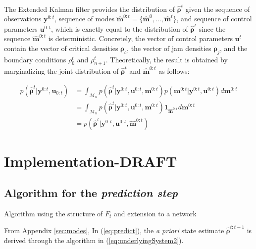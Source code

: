 The Extended Kalman filter provides the distribution of $\hat{\boldsymbol\rho}^{t}$ given the sequence of observations $\boldsymbol y^{0:t}$, sequence of modes $\hat{\boldsymbol m}^{0:t} = \{\hat{\boldsymbol m}^{0},...,\hat{\boldsymbol m}^{t}\}$, and sequence of control parameters $\boldsymbol u^{0:t}$, which is exactly equal to the distribution of $\hat{\boldsymbol\rho}^{t}$ since the sequence $\hat{\boldsymbol m}^{0:t}$ is deterministic. Concretely, the vector of control parameters $\boldsymbol u^{t}$ contain the vector of critical densities $\boldsymbol\rho_{c}$, the vector of jam densities $\boldsymbol\rho_{j}$, and the boundary conditions $\rho^{t}_{0}$ and $\rho^{t}_{n+1}$. Theoretically, the result is obtained by marginalizing the joint distribution of $\hat{\boldsymbol\rho}^{t}$ and $\hat{\boldsymbol m}^{0:t}$ as follows:

\begin{equation}
\begin{array}{ll}
p(\hat{\boldsymbol\rho}^{t}|\boldsymbol y^{0:t},\boldsymbol u_{0:t}) & =
\int_{\mathcal{M}_{n}} p(\hat{\boldsymbol\rho}^{t}|\boldsymbol y^{0:t},\boldsymbol u^{0:t},\boldsymbol m^{0:t})p(\boldsymbol m^{0:t}|\boldsymbol y^{0:t},\boldsymbol u^{0:t})
d\boldsymbol m^{0:t}\\ 
& = \int_{\mathcal{M}_{n}} p(\hat{\boldsymbol\rho}^{t}|\boldsymbol y^{0:t},\boldsymbol u^{0:t},\boldsymbol m^{0:t})\boldsymbol 1_{\hat{\boldsymbol m}^{0:t}}d\boldsymbol m^{0:t}\\[1ex]
& = p(\hat{\boldsymbol\rho}^{t}|\boldsymbol y^{0:t},\boldsymbol u^{0:t},\hat{\boldsymbol m}^{0:t})
\label{eq:marginalization}
\end{array}
\end{equation}

\section{Implementation-DRAFT}

\subsection{Algorithm for the \textit{prediction step}}

Algorithm using the structure of $F_{t}$ and extension to a network

From Appendix \ref{sec:modes},  In (\ref{eq:predict}), the \textit{a priori} state estimate $\hat{\boldsymbol\rho}^{t:t-1}$ is derived through the algorithm in (\ref{eq:underlyingSystem2}).

